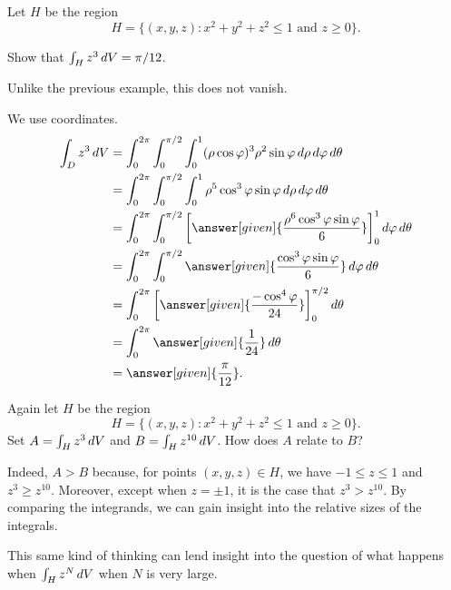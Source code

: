 \documentclass{ximera}
\begin{document}
\begin{example}
  Let $H$ be the region
  \[
  H = \{ (x,y,z) : x^2 + y^2 + z^2 \leq 1 \text{ and } z \geq 0 \}.
  \]

  Show that $\int_H z^3 \mathop{}\!d V = \pi/12$.

  \begin{explanation}
    Unlike the previous example, this does not vanish.
    
    We use  coordinates.
    \begin{align*}
      \int_D z^3 \d V
      &= \int_{0}^{2\pi} \int_{0}^{\pi/2} \int_{0}^1 (\rho \cos \varphi)^3 \rho^2 \sin \varphi \d \rho \d \varphi \d \theta \\
      &= \int_{0}^{2\pi} \int_{0}^{\pi/2} \int_{0}^1 \rho^5 \cos^3 \varphi \sin \varphi \d \rho \d \varphi \d \theta \\
      &= \int_{0}^{2\pi} \int_{0}^{\pi/2} \eval{\answer[given]{\frac{\rho^6 \cos^3 \varphi \sin \varphi}{6}}}_0^1 \d \varphi \d \theta \\
      &= \int_{0}^{2\pi} \int_{0}^{\pi/2} \answer[given]{\frac{\cos^3 \varphi \sin \varphi}{6}} \d \varphi \d \theta \\
      &= \int_{0}^{2\pi} \eval{\answer[given]{\frac{-\cos^4 \varphi}{24}}}_{0}^{\pi/2} \d \theta \\
      &= \int_{0}^{2\pi} \answer[given]{\frac{1}{24}} \d \theta \\
      &= \answer[given]{\frac{\pi}{12}}.
    \end{align*}
  \end{explanation}
\end{example}

\begin{question}
  Again let $H$ be the region
  \[
  H = \{ (x,y,z): \text{$x^2 + y^2 +
    z^2 \leq 1$ and $z \geq 0 $}\}.
  \]
  Set $A = \int_H z^3 \mathop{}\!d V$ and $B = \int_H z^{10} \mathop{}\!d V$.  How does $A$ relate to $B$?

  \begin{multipleChoice}
  \end{multipleChoice}

  \begin{feedback}[correct]
    Indeed, $A > B$ because, for points $(x,y,z) \in H$, we have
    $-1 \leq z \leq 1$ and $z^3 \geq z^{10}$.  Moreover, except when
    $z = \pm 1$, it is the case that $z^3 > z^{10}$.  By comparing the
    integrands, we can gain insight into the relative sizes of the
    integrals.

    This same kind of thinking can lend insight into the question of
    what happens when $\int_H z^N \mathop{}\!d V$ when $N$ is very
    large.
  \end{feedback}
\end{question}
\end{document}
